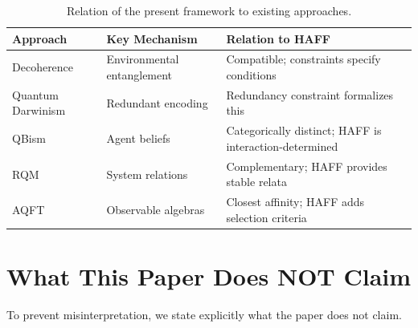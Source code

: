 \documentclass[12pt,a4paper,openany]{book}
\begin{document}
\begin{table}[ht]
\centering
\small
\begin{tabular}{|P{3cm}|P{4cm}|P{5.5cm}|}
\hline
\textbf{Approach} & \textbf{Key Mechanism} & \textbf{Relation to HAFF} \\
\hline
Decoherence & Environmental entanglement & Compatible; constraints specify conditions \\
\hline
Quantum Darwinism & Redundant encoding & Redundancy constraint formalizes this \\
\hline
QBism & Agent beliefs & Categorically distinct; HAFF is interaction-determined \\
\hline
RQM & System relations & Complementary; HAFF provides stable relata \\
\hline
AQFT & Observable algebras & Closest affinity; HAFF adds selection criteria \\
\hline
\end{tabular}
\caption{Relation of the present framework to existing approaches.}
\label{H-E-tab:relations}
\end{table}

\section{What This Paper Does NOT Claim}
\label{H-E-sec:nonclaims}

To prevent misinterpretation, we state explicitly what the paper does not claim.
\end{document}
